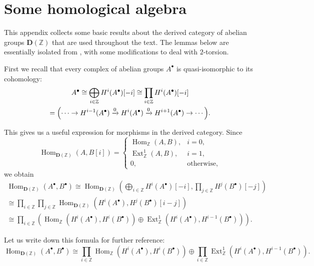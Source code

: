 \documentclass[leqno,12pt]{article}
\theoremstyle{plain}
\theoremstyle{definition}
\DeclareMathOperator{\Hom}{Hom}
\DeclareMathOperator{\Ext}{Ext}
\newcommand{\ZZ}{\mathbb{Z}}
\begin{document}

\pagebreak
\appendix
\section{Some homological algebra}
\label{app:homological-algebra}

This appendix collects some basic results about the derived category of abelian
groups $\mathbf{D} (\ZZ)$ that are used throughout the text. The lemmas below
are essentially isolated from \cite{Flach-Morin-2018}, with some modifications
to deal with $2$-torsion.

First we recall that every complex of abelian groups $A^\bullet$ is
quasi-isomorphic to its cohomology:
\begin{multline*}
  A^\bullet \cong \bigoplus_{i\in \ZZ} H^i (A^\bullet) [-i] \cong
  \prod_{i\in \ZZ} H^i (A^\bullet) [-i] \\
  = \Bigl(\cdots \to H^{i-1} (A^\bullet) \xrightarrow{0} H^i (A^\bullet)
  \xrightarrow{0} H^{i+1} (A^\bullet) \to \cdots\Bigr).
\end{multline*}

This gives us a useful expression for morphisms in the derived category.
Since
\[ \Hom_{\mathbf{D} (\ZZ)} (A,B [i]) = \begin{cases}
\Hom_\ZZ (A,B), & i = 0,\\
\Ext_\ZZ^1 (A,B), & i = 1,\\
0, & \text{otherwise},
\end{cases} \]
we obtain
\begin{multline*}
  \Hom_{\mathbf{D} (\ZZ)} (A^\bullet, B^\bullet) \cong
  \Hom_{\mathbf{D} (\ZZ)} (\bigoplus_{i\in\ZZ} H^i (A^\bullet) [-i], \prod_{j\in\ZZ} H^j (B^\bullet) [-j]) \\
  \cong \prod_{i\in \ZZ} \prod_{j\in \ZZ} \Hom_{\mathbf{D} (\ZZ)} (H^i (A^\bullet), H^j (B^\bullet) [i-j]) \\
  \cong \prod_{i\in \ZZ} \left(\Hom_\ZZ (H^i (A^\bullet), H^i (B^\bullet)) \oplus \Ext_\ZZ^1 (H^i (A^\bullet), H^{i-1} (B^\bullet))\right).
\end{multline*}

Let us write down this formula for further reference:
\begin{equation}
  \label{eqn:morphisms-in-D(Z)}
  \Hom_{\mathbf{D} (\ZZ)} (A^\bullet, B^\bullet) \cong
  \prod_{i\in \ZZ} \Hom_\ZZ (H^i (A^\bullet), H^i (B^\bullet)) \oplus
  \prod_{i\in \ZZ} \Ext_\ZZ^1 (H^i (A^\bullet), H^{i-1} (B^\bullet)).
\end{equation}
\end{document}
